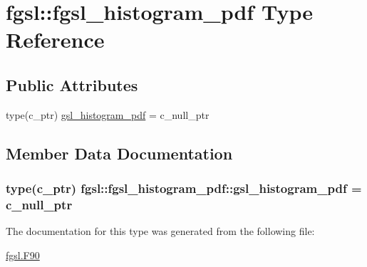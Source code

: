\hypertarget{structfgsl_1_1fgsl__histogram__pdf}{}\section{fgsl\+:\+:fgsl\+\_\+histogram\+\_\+pdf Type Reference}
\label{structfgsl_1_1fgsl__histogram__pdf}
\subsection*{Public Attributes}
\begin{DoxyCompactItemize}
\item 
type(c\+\_\+ptr) \hyperlink{structfgsl_1_1fgsl__histogram__pdf_a0d245bc39435c26ab3d37eea9939d5f6}{gsl\+\_\+histogram\+\_\+pdf} = c\+\_\+null\+\_\+ptr
\end{DoxyCompactItemize}


\subsection{Member Data Documentation}
\hypertarget{structfgsl_1_1fgsl__histogram__pdf_a0d245bc39435c26ab3d37eea9939d5f6}{}
\subsubsection[{gsl\+\_\+histogram\+\_\+pdf}]{\setlength{\rightskip}{0pt plus 5cm}type(c\+\_\+ptr) fgsl\+::fgsl\+\_\+histogram\+\_\+pdf\+::gsl\+\_\+histogram\+\_\+pdf = c\+\_\+null\+\_\+ptr}\label{structfgsl_1_1fgsl__histogram__pdf_a0d245bc39435c26ab3d37eea9939d5f6}


The documentation for this type was generated from the following file\+:\begin{DoxyCompactItemize}
\item 
\hyperlink{fgsl_8F90}{fgsl.\+F90}\end{DoxyCompactItemize}
